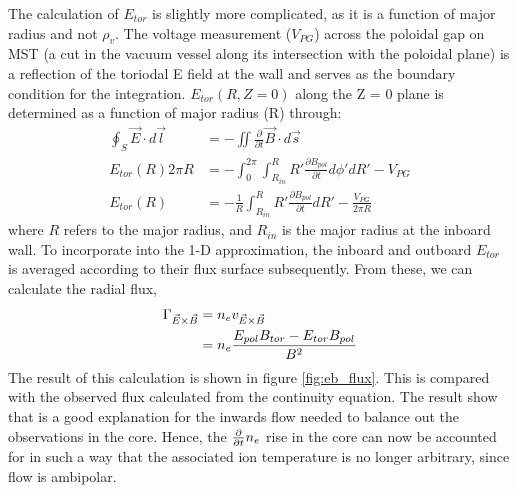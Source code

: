 The calculation of $E_{tor}$ is slightly more complicated, as it is a function of major radius and not $\rho_v$. The voltage measurement ($V_{PG}$) across the poloidal gap on MST (a cut in the vacuum vessel along its intersection with the poloidal plane) is a reflection of the toriodal E field at the wall and serves as the boundary condition for the integration. $E_{tor}(R, Z=0)$ along the Z = 0 plane is determined as a function of major radius (R) through:
\begin{align}
\oint_S \vec{E}\cdot d\vec{l} &= -\iint \frac{\partial}{\partial t}\vec{B}\cdot d\vec{s}\\
E_{tor}(R) 2\pi R &= -\int_0^{2\pi}\int_{R_{in}}^{R}R'\frac{\partial B_{pol}}{\partial t} d\phi'dR' - V_{PG}\\
E_{tor}(R) &= -\frac{1}{R}\int_{R_{in}}^{R}R'\frac{\partial B_{pol}}{\partial t} dR' - \frac{V_{PG}}{2\pi R}\label{eqn:E_tor}
\end{align}
where $R$ refers to the major radius, and $R_{in}$ is the major radius at the inboard wall. To incorporate into the 1-D approximation, the inboard and outboard $E_{tor}$ is averaged according to their flux surface subsequently. From these, we can calculate the radial \ecb flux,
\begin{align}
    \Gamma_{\vec{E} \times \vec{B}} &= n_e v_{\vec{E}\times\vec{B}} \nonumber \\
    &= n_{e} \frac{E_{pol}B_{tor} - E_{tor}B_{pol}}{B^2}
\end{align}
The result of this calculation is shown in figure \ref{fig:eb_flux}. This is compared with the observed flux calculated from the continuity equation. The result show that \ecb is a good explanation for the inwards flow needed to balance out the observations in the core. Hence, the $\frac{\partial}{\partial t} n_e$ rise in the core can now be accounted for in such a way that the associated ion temperature is no longer arbitrary, since \ecb flow is ambipolar.

